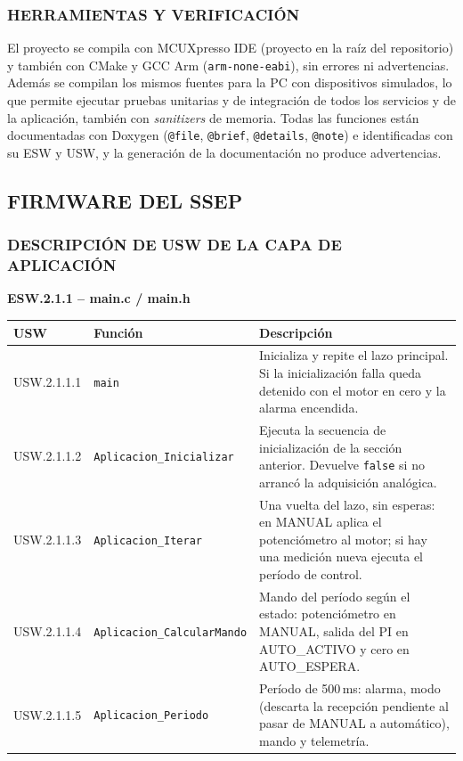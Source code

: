 \subsubsection{HERRAMIENTAS Y VERIFICACIÓN}

El proyecto se compila con MCUXpresso IDE (proyecto en la raíz del repositorio) y también
con CMake y GCC Arm (\texttt{arm-none-eabi}), sin errores ni advertencias. Además se
compilan los mismos fuentes para la PC con dispositivos simulados, lo que permite ejecutar
pruebas unitarias y de integración de todos los servicios y de la aplicación, también con
\textit{sanitizers} de memoria. Todas las funciones están documentadas con Doxygen
(\texttt{@file}, \texttt{@brief}, \texttt{@details}, \texttt{@note}) e identificadas con su
ESW y USW, y la generación de la documentación no produce advertencias.

\subsection{FIRMWARE DEL SSEP}

\subsubsection{DESCRIPCIÓN DE USW DE LA CAPA DE APLICACIÓN}

\textbf{ESW.2.1.1 -- main.c / main.h}

\begin{longtable}{|p{2.4cm}|p{4.6cm}|p{7.6cm}|}
\hline
\textbf{USW} & \textbf{Función} & \textbf{Descripción} \\ \hline
\endhead
USW.2.1.1.1 & \texttt{main} & Inicializa y repite el lazo principal. Si la
inicialización falla queda detenido con el motor en cero y la alarma encendida. \\ \hline
USW.2.1.1.2 & \texttt{Aplicacion\_Inicializar} & Ejecuta la secuencia de inicialización
de la sección anterior. Devuelve \texttt{false} si no arrancó la adquisición
analógica. \\ \hline
USW.2.1.1.3 & \texttt{Aplicacion\_Iterar} & Una vuelta del lazo, sin esperas: en MANUAL
aplica el potenciómetro al motor; si hay una medición nueva ejecuta el período de
control. \\ \hline
USW.2.1.1.4 & \texttt{Aplicacion\_CalcularMando} & Mando del período según el estado:
potenciómetro en MANUAL, salida del PI en AUTO\_ACTIVO y cero en AUTO\_ESPERA. \\ \hline
USW.2.1.1.5 & \texttt{Aplicacion\_Periodo} & Período de 500\,ms: alarma, modo (descarta
la recepción pendiente al pasar de MANUAL a automático), mando y telemetría. \\ \hline
\end{longtable}


